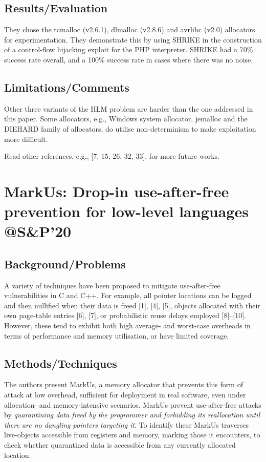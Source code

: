 \subsection{Results/Evaluation}
 They chose the tcmalloc (v2.6.1), dlmalloc (v2.8.6) and avrlibc (v2.0) allocators for experimentation.  They demonstrate this by using SHRIKE in the construction of a control-flow hijacking exploit for the PHP interpreter.  SHRIKE had a 70\% success rate overall, and a 100\% success rate in cases where there was no noise.
\subsection{Limitations/Comments}
Other three variants of the HLM problem are harder than the one addressed in this paper. Some allocators, e.g., Windows system allocator, jemalloc and the DIEHARD family of allocators, do utilise non-determinism to make exploitation more difficult.

Read other references, e.g., [7, 15, 26, 32, 33], for more future works.
\newpage
\section{MarkUs: Drop-in use-after-free prevention for
low-level languages @S\&P'20}

\subsection{Background/Problems}
A variety of techniques have been proposed to mitigate use-after-free vulnerabilities in C and C++. For example, all pointer locations can be logged and then nullified when their data is freed [1], [4], [5], objects allocated with their own page-table entries [6], [7], or probabilistic reuse delays employed [8]–[10]. However, these tend to exhibit both high average- and worst-case overheads in terms of performance and memory utilisation, or have limited coverage.
\subsection{Methods/Techniques}
The authors present MarkUs, a memory allocator that prevents this form of attack at low overhead, sufficient for deployment in real software, even under allocation- and memory-intensive scenarios. MarkUs prevent use-after-free attacks by \emph{quarantining data freed by the programmer and forbidding its reallocation until there are no dangling pointers targeting it}. To identify these MarkUs traverses live-objects accessible from registers and memory, marking those it encounters, to check whether quarantined data is accessible from any currently allocated location. 


